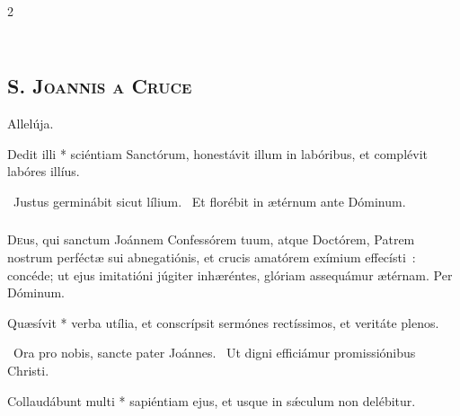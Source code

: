 \documentclass[9pt,twoside]{extarticle}
\begin{document}
\begin{multicols}{2}
\subsection*{\\ \textbf{\textsc{S. Joannis a Cruce}}}

\small {}

 Allelúja.

\normalsize
{} Dedit illi * sciéntiam Sanctórum, honestávit illum in labóribus, et complévit labóres illíus.

~Justus germinábit sicut lílium. ~Et florébit in ætérnum ante Dóminum.

\subsubsection*{\center {}}
\lettrine{D}eus, qui sanctum Joánnem Confessórem tuum, atque Doctórem, Patrem nostrum perféctæ sui abnegatiónis, et crucis amatórem exímium effecísti~: concéde; ut ejus imitatióni júgiter inhæréntes, glóriam assequámur ætérnam. Per Dóminum.

 Quæsívit * verba utília, et conscrípsit sermónes rectíssimos, et veritáte plenos.

~Ora pro nobis, sancte pater Joánnes. ~Ut digni efficiámur promissiónibus Christi.

\smallskip
{} Collaudábunt multi * sapiéntiam ejus, et usque in sǽculum non delébitur.



\end{multicols}
\end{document}
